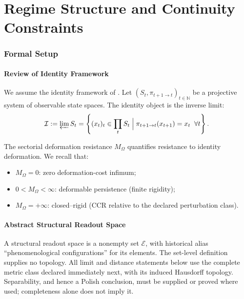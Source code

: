 \part{Regime Structure and Continuity Constraints}
\section{Formal Setup}

\subsection{Review of Identity Framework}

We assume the identity framework of \cite{paper1}. Let $(S_t, \pi_{t+1 \to t})_{t \in \mathbb{N}}$ be a projective system of observable state spaces. The identity object is the inverse limit:
\begin{equation}
    \mathcal{I} := \varprojlim S_t = \left\{ (x_t)_t \in \prod_t S_t \;\Big|\; \pi_{t+1 \to t}(x_{t+1}) = x_t \;\; \forall t \right\}.
\end{equation}

The sectorial deformation resistance $M_\Omega$ quantifies resistance to identity deformation. We recall that:
\begin{itemize}[leftmargin=*]
    \item $M_\Omega = 0$: zero deformation-cost infimum;
    \item $0 < M_\Omega < \infty$: deformable persistence (finite rigidity);
    \item $M_\Omega = +\infty$: closed--rigid (CCR relative to the declared perturbation class).
\end{itemize}

\subsection{Abstract Structural Readout Space}

\begin{definition}\label{def:phenspace}
A structural readout space is a nonempty set $\mathcal E$, with historical
alias ``phenomenological configurations'' for its elements. The set-level
definition supplies no topology. All limit and distance statements below
use the complete metric class declared immediately next, with its induced
Hausdorff topology. Separability, and hence a Polish conclusion, must be
supplied or proved where used; completeness alone does not imply it.
\end{definition}

